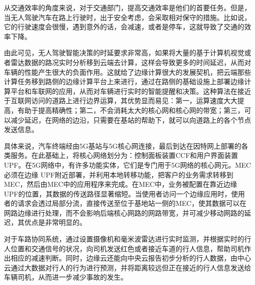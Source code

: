 \documentclass[UTF8,12pt,twoside,a4paper]{ctexart} %
\begin{document}
从交通效率的角度来说，对于交通部门，提高交通效率是他们的首要任务。但是，当无人驾驶汽车在路上行驶时，出于安全考虑，会采取相对保守的措施。比如说，它的行驶速度会很慢，遇到意外的话，会减速，或者是停车，这就导致了交通的效率下降。	

由此可见，无人驾驶智能决策的时延要求非常高，如果将大量的基于计算机视觉或者雷达数据的路况实时分析移到云端去计算，这样会导致更多的时间延迟，从而对车辆的性能产生很大的负面作用。这就给了边缘计算很大的发展契机，把云端那些计算任务移到路侧的边缘计算平台上来进行，通过在路侧的基础设施上部署边缘计算平台和车联网的应用，从而对车辆进行实时的智能提醒和决策。这种算法在接近于互联网访问的道路上进行边界运算，其优势显而易见：第一，运算速度大大提高，有助于提高精确性；第二，不会消耗太大的核心网和核心网的带宽；第三，可以减少延迟，在网络的边沿，只需要在基站的帮助下，就可以向道路上的各个节点发送信息。

具体来说，汽车终端经由5G基站与5G核心网连接，最后到达在因特网上部署的各类服务。在此基础上，将核心网络划分为：控制面板装置CCF和用户界面装置UPF。在5G网络中，有许多功能实体，它们是专门用于5G网络的核心网元。MEC必须在边缘 UPF附近部署，并利用本地转移功能，把客户的业务需求转移到MEC，然后由MEC中的应用程序来完成。在MEC中，业务被配置在靠近边缘UPF的位置，其数据的传送路径显著缩短。当使用者访问一个边缘应用时，使用者的请求会透过局部分流，直接传送至位于基地站一侧的MEC，使其数据可以在网路边缘进行处理，而不会影响后端核心网路的网路带宽，并可减少移动网路的延迟，其优点是非常明显的。

对于车路协同系统，通过设置摄像机和毫米波雷达进行实时监测，并根据实时的行人位置和交通信号的状况，向司机发送红色或者接近车道的行人信息，帮助司机作出相应的减速判断。同时，边缘云还能向中央云报告初步分析的行人数据，由中心云通过大数据对行人的行为进行预测，并将距离较远但正在接近的行人信息发送给车辆司机，从而进一步减少事故的发生。
\vspace{10pt}
\end{document}
